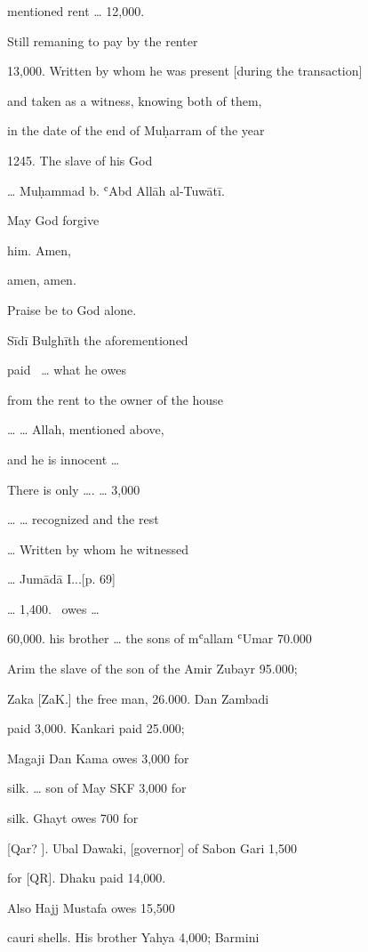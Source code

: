 \documentclass[12pt]{article}
\begin{document}
\begin{pages}
\begin{Rightside}
\begin{LTR}
mentioned rent {\dots} 12,000.

Still remaning to pay by the renter

13,000. Written by whom he was present [during the transaction]

and taken as a witness, knowing both of them,

in the date of the end of Muḥarram of the year

1245. The slave of his God

{\dots} Muḥammad b. ʿAbd Allāh al-Tuwātī.

May God forgive

him. Amen,

amen, amen.


Praise be to God alone.

Sīdī Bulghīth the aforementioned

paid \ {\dots} what he owes

from the rent to the owner of the house

{\dots} {\dots} Allah, mentioned above,

and he is innocent {\dots}

There is only {\dots}. {\dots} 3,000

{\dots} {\dots} recognized and the rest

{\dots} Written by whom he witnessed

{\dots} Jumādā I...[p. 69]


{\dots} 1,400. \ owes {\dots}

60,000. his brother {\dots} the sons of mʿallam ʿUmar 70.000

Arim the slave of the son of the Amir Zubayr 95.000;

Zaka [ZaK.] the free man, 26.000. Dan Zambadi

paid 3,000. Kankari paid 25.000;

Magaji Dan Kama owes 3,000 for

silk. {\dots} son of May SKF 3,000 for

silk. Ghayt owes 700 for

[Qar? ]. Ubal Dawaki, [governor] of Sabon Gari 1,500

for [QR]. Dhaku paid 14,000.


Also Hajj Mustafa owes 15,500

cauri shells. His brother Yahya 4,000;  Barmini


\end{LTR}
\end{Rightside}
\end{pages}
\end{document}
